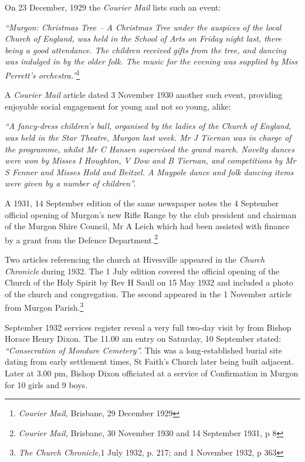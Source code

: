 On 23 December, 1929 the \emph{Courier Mail} lists such an event:



\emph{``Murgon: Christmas Tree -- A Christmas Tree under the auspices of the local Church of England, was held in the School of Arts on Friday night last, there being a good attendance. The children received gifts from the tree, and dancing was indulged in by the older folk. The music for the evening was supplied by Miss Perrett's orchestra.''}\footnote{\emph{Courier Mail,} Brisbane, 29 December 1929}


A \emph{Courier Mail} article dated 3 November 1930 another such event, providing enjoyable social engagement for young and not so young, alike:



\emph{``A fancy-dress children's ball, organised by the ladies of the Church of England, was held in the Star Theatre, Murgon last week. Mr J Tiernan was in charge of the programme, whilst Mr C Hansen supervised the grand march. Novelty dances were won by Misses I Houghton, V Dow and B Tiernan, and competitions by Mr S Fenner and Misses Hold and Beitzel. A Maypole dance and folk dancing items were given by a number of children''.}



A 1931, 14 September edition of the same newspaper notes the 4 September official opening of Murgon's new Rifle Range by the club president and chairman of the Murgon Shire Council, Mr A Leich which had been assisted with finance by a grant from the Defence Department\emph{.}\footnote{\emph{Courier Mail,} Brisbane, 30 November 1930 and 14 September 1931, p 8}


Two articles referencing the church at Hivesville appeared in the \emph{Church Chronicle} during 1932. The 1 July edition covered the official opening of the Church of the Holy Spirit by Rev H Saull on 15 May 1932 and included a photo of the church and congregation. The second appeared in the 1 November article from Murgon Parish.\footnote{\emph{The Church Chronicle,}1 July 1932, p. 217; and 1 November 1932, p 363}


September 1932 services register reveal a very full two-day visit by from Bishop Horace Henry Dixon. The 11.00 am entry on Saturday, 10 September stated: \emph{``Consecration of Mondure Cemetery''.} This was a long-established burial site dating from early settlement times, St Faith's Church later being built adjacent. Later at 3.00 pm, Bishop Dixon officiated at a service of Confirmation in Murgon for 10 girls and 9 boys.



